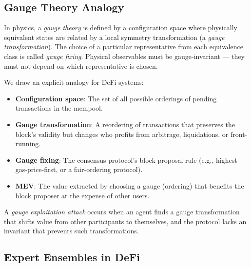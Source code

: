 \documentclass[12pt,a4paper]{article}
\theoremstyle{remark}
\begin{document}
\subsection{Gauge Theory Analogy}

In physics, a \emph{gauge theory} is defined by a configuration space where
physically equivalent states are related by a local symmetry transformation
(a \emph{gauge transformation}). The choice of a particular representative
from each equivalence class is called \emph{gauge fixing}. Physical observables
must be gauge-invariant --- they must not depend on which representative is
chosen.

We draw an explicit analogy for DeFi systems:
\begin{itemize}
\item \textbf{Configuration space}: The set of all possible orderings of
pending transactions in the mempool.
\item \textbf{Gauge transformation}: A reordering of transactions that preserves
the block's validity but changes who profits from arbitrage, liquidations, or
front-running.
\item \textbf{Gauge fixing}: The consensus protocol's block proposal rule (e.g.,
highest-gas-price-first, or a fair-ordering protocol).
\item \textbf{MEV}: The value extracted by choosing a gauge (ordering) that
benefits the block proposer at the expense of other users.
\end{itemize}

A \emph{gauge exploitation attack} occurs when an agent finds a gauge
transformation that shifts value from other participants to themselves, and
the protocol lacks an invariant that prevents such transformations.

\subsection{Expert Ensembles in DeFi}
\end{document}
